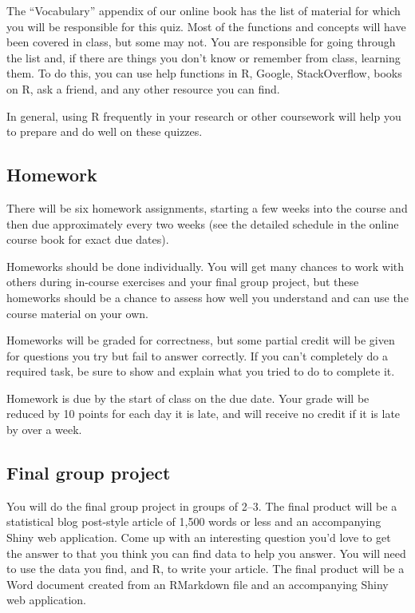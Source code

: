 \documentclass[]{book}
\begin{document}
The ``Vocabulary'' appendix of our online book has the list of material
for which you will be responsible for this quiz. Most of the functions
and concepts will have been covered in class, but some may not. You are
responsible for going through the list and, if there are things you
don't know or remember from class, learning them. To do this, you can
use help functions in R, Google, StackOverflow, books on R, ask a
friend, and any other resource you can find.

In general, using R frequently in your research or other coursework will
help you to prepare and do well on these quizzes.

\subsection{Homework}\label{homework}

There will be six homework assignments, starting a few weeks into the
course and then due approximately every two weeks (see the detailed
schedule in the online course book for exact due dates).

Homeworks should be done individually. You will get many chances to work
with others during in-course exercises and your final group project, but
these homeworks should be a chance to assess how well you understand and
can use the course material on your own.

Homeworks will be graded for correctness, but some partial credit will
be given for questions you try but fail to answer correctly. If you
can't completely do a required task, be sure to show and explain what
you tried to do to complete it.

Homework is due by the start of class on the due date. Your grade will
be reduced by 10 points for each day it is late, and will receive no
credit if it is late by over a week.

\subsection{Final group project}\label{final-group-project}

You will do the final group project in groups of 2--3. The final product
will be a statistical blog post-style article of 1,500 words or less and
an accompanying Shiny web application. Come up with an interesting
question you'd love to get the answer to that you think you can find
data to help you answer. You will need to use the data you find, and R,
to write your article. The final product will be a Word document created
from an RMarkdown file and an accompanying Shiny web application.
\end{document}
